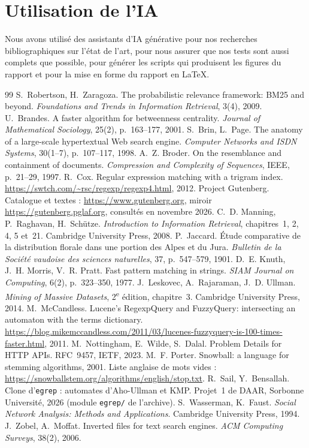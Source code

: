 \documentclass[11pt,a4paper]{article}
\begin{document}
\section*{Utilisation de l'IA}
Nous avons utilisé des assistants d'IA générative pour nos recherches
bibliographiques sur l'état de l'art, pour nous assurer que nos tests sont
aussi complets que possible, pour générer les scripts qui produisent les
figures du rapport et pour la mise en forme du rapport en \LaTeX.

\begin{thebibliography}{99}
\small
{} S.~Robertson, H.~Zaragoza. The probabilistic relevance framework:
  BM25 and beyond. \emph{Foundations and Trends in Information Retrieval}, 3(4), 2009.
 U.~Brandes. A faster algorithm for betweenness centrality.
  \emph{Journal of Mathematical Sociology}, 25(2), p.~163--177, 2001.
 S.~Brin, L.~Page. The anatomy of a large-scale hypertextual Web
  search engine. \emph{Computer Networks and ISDN Systems}, 30(1--7),
  p.~107--117, 1998.
 A.~Z. Broder. On the resemblance and containment of documents.
  \emph{Compression and Complexity of Sequences}, IEEE, p.~21--29, 1997.
 R.~Cox. Regular expression matching with a trigram index.
  \url{https://swtch.com/~rsc/regexp/regexp4.html}, 2012.
 Project Gutenberg. Catalogue et textes :
  \url{https://www.gutenberg.org}, miroir \url{https://gutenberg.pglaf.org},
  consultés en novembre 2026.
 C.~D. Manning, P.~Raghavan, H.~Schütze. \emph{Introduction to
  Information Retrieval}, chapitres~1, 2, 4, 5 et~21. Cambridge University Press, 2008.
 P.~Jaccard. Étude comparative de la distribution florale dans
  une portion des Alpes et du Jura. \emph{Bulletin de la Société vaudoise des
  sciences naturelles}, 37, p.~547--579, 1901.
 D.~E. Knuth, J.~H. Morris, V.~R. Pratt. Fast pattern matching in
  strings. \emph{SIAM Journal on Computing}, 6(2), p.~323--350, 1977.
 J.~Leskovec, A.~Rajaraman, J.~D. Ullman. \emph{Mining of Massive
  Datasets}, 2\textsuperscript{e} édition, chapitre~3. Cambridge University
  Press, 2014.
 M.~McCandless. Lucene's RegexpQuery and FuzzyQuery: intersecting
  an automaton with the terms dictionary. \url{https://blog.mikemccandless.com/2011/03/lucenes-fuzzyquery-is-100-times-faster.html}, 2011.
 M.~Nottingham, E.~Wilde, S.~Dalal. Problem Details for HTTP
  APIs. RFC~9457, IETF, 2023.
 M.~F. Porter. Snowball: a language for stemming
  algorithms, 2001. Liste anglaise de mots vides :
  \url{https://snowballstem.org/algorithms/english/stop.txt}.
 R.~Sail, Y.~Bensallah. Clone d'\texttt{egrep} : automates
  d'Aho-Ullman et KMP. Projet~1 de DAAR, Sorbonne Université, 2026 (module
  \texttt{egrep/} de l'archive).
 S.~Wasserman, K.~Faust. \emph{Social Network Analysis:
  Methods and Applications}. Cambridge University Press, 1994.
 J.~Zobel, A.~Moffat. Inverted files for text search engines.
  \emph{ACM Computing Surveys}, 38(2), 2006.
\end{thebibliography}
\end{document}
